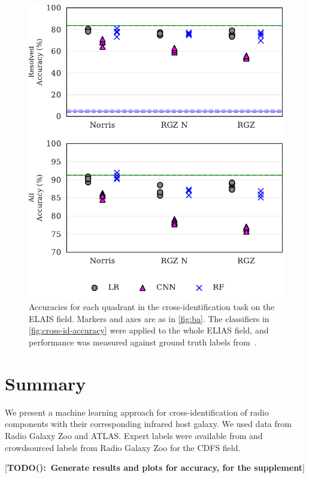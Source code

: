 \documentclass[fleqn,usenatbib,usedcolumn]{mnras}
\newcommand{\matthew}[2]{ {\color{white!20!violet}[{\bf TODO(#1):~{#2}}]} }
\begin{document}
\begin{figure}
  \centering
  \includegraphics[width=\columnwidth]{images/elais_cross_identification_grid.pdf}
  \caption{Accuracies for each quadrant in the cross-identification
    task on the ELAIS field. Markers and axes are as in \autoref{fig:ba}.
    The classifiers in \autoref{fig:cross-id-accuracy}
    were applied to the whole ELIAS field, and performance was measured against
    ground truth labels from~\citet{middelberg08}.
    \label{fig:elais-cross-id-accuracy}}
\end{figure}


\section{Summary}

We present a machine learning approach for cross-identification of radio components with their corresponding infrared host galaxy. We used data from Radio Galaxy Zoo and ATLAS.  Expert labels were available from \citet{norris06} and crowdsourced labels from Radio Galaxy Zoo for the CDFS field.

\matthew{}{Generate results and plots for accuracy, for the supplement}
\end{document}
